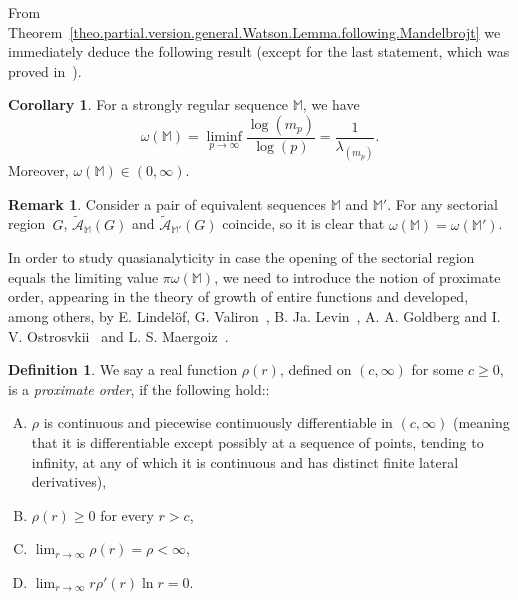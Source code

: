 \documentclass[11pt,a4paper]{article}
\theoremstyle{definition}
\newtheorem{cor}[theo]{Corollary}
\newtheorem{defi}[theo]{Definition}
\newtheorem{rema}[theo]{Remark}
\newenvironment{coro}{\smallskip\begin{cor}}{\end{cor}\smallskip}
\newenvironment{den}{\smallskip\begin{defi}}{\end{defi}\smallskip}
\def\oo{\infty}
\def\ri{\rightarrow}
\def\o{\omega}
\def\ro{\rho}
\def\M{\mathbb{M}}
\def\bM{\mathbb{M}}%
\begin{document}
From Theorem~\ref{theo.partial.version.general.Watson.Lemma.following.Mandelbrojt} we immediately deduce the following result (except for the last statement, which was proved in~\cite{SanzFlat}).

\begin{coro}\label{coroOrderM}
For a strongly regular sequence $\M$, we have
\begin{equation*}
\omega(\M)=\liminf_{p\to\infty}
\frac{\log(m_{p})}{\log(p)}=\frac{1}{\lambda_{(m_p)}}.
\end{equation*}
Moreover, $\omega(\M) \in (0,\oo)$.
\end{coro}




\begin{rema}
Consider a pair of equivalent sequences $\bM$ and $\bM'$. For any sectorial region~$G$,
 $\tilde{\mathcal{A}}_{\M}(G)$ and $\tilde{\mathcal{A}}_{\M'}(G)$ coincide, so it is clear that $\omega(\M)=\omega(\M')$.
\end{rema}

In order to study quasianalyticity in case the opening of the sectorial region equals the limiting value $\pi \o(\M)$, we need to introduce the notion of proximate order,
appearing in the theory of
growth of entire functions and developed, among others, by E. Lindel\"of, G. Valiron~\cite{Valiron42}, B. Ja. Levin~\cite{Levin}, A. A. Goldberg and I. V. Ostrosvkii~\cite{GoldbergOstrowskii} and L. S. Maergoiz~\cite{Maergoiz}.

\begin{den}\label{OAD:1}
We say a real function $\ro(r)$, defined on $(c,\oo)$ for some $c\ge 0$, is a {\it proximate order},
if the following hold::
 \begin{enumerate}[(A)]
  \item $\ro$ is continuous and piecewise continuously differentiable in $(c,\oo)$ (meaning that it is differentiable except possibly at a sequence of points, tending to infinity, at any of which it is continuous and has distinct finite lateral derivatives),\label{OA1:1}
  \item $\ro(r) \geq 0$ for every $r>c$,\label{OA2:1}
  \item $\lim_{r \ri \oo} \ro(r)=\ro< \oo$, \label{OA3:1}
  \item $\lim_{r  \ri \oo} r \ro'(r) \ln r = 0$. \label{OA4:1}
 \end{enumerate}
\end{den}
\end{document}

